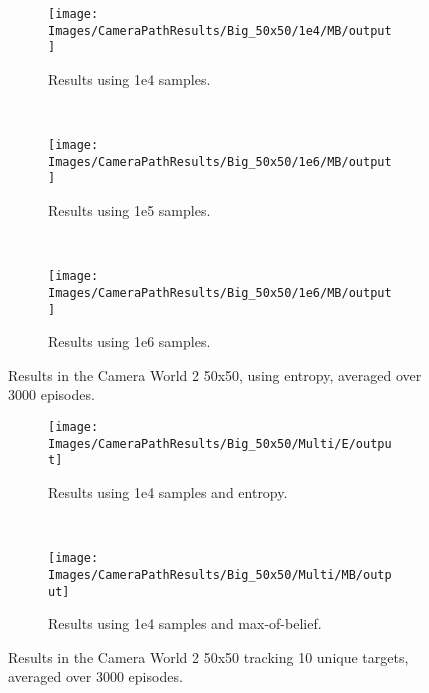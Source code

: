 \begin{figure}[ht]
        \centering
        \begin{subfigure}[t]{0.3\textwidth}
                \texttt{[image: Images/CameraPathResults/Big\_50x50/1e4/MB/output]}
                \caption{Results using 1e4 samples.}
                \label{fig:cpb4mb}
        \end{subfigure}%
        ~ %
        \begin{subfigure}[t]{0.3\textwidth}
                \texttt{[image: Images/CameraPathResults/Big\_50x50/1e6/MB/output]}
                \caption{Results using 1e5 samples.}
                \label{fig:cpb5mb}
        \end{subfigure}
        ~ %
        \begin{subfigure}[t]{0.3\textwidth}
                \texttt{[image: Images/CameraPathResults/Big\_50x50/1e6/MB/output]}
                \caption{Results using 1e6 samples.}
                \label{fig:cpb6mb}
        \end{subfigure}
        \caption{Results in the Camera World 2 50x50, using entropy, averaged over 3000 episodes.}\label{fig:cpbmb}
\end{figure}

\begin{figure}[ht]
        \centering
        \begin{subfigure}[t]{0.5\textwidth}
                \texttt{[image: Images/CameraPathResults/Big\_50x50/Multi/E/output]}
                \caption{Results using 1e4 samples and entropy.}
                \label{fig:cpb4e10}
        \end{subfigure}%
        ~ %
        \begin{subfigure}[t]{0.5\textwidth}
                \texttt{[image: Images/CameraPathResults/Big\_50x50/Multi/MB/output]}
                \caption{Results using 1e4 samples and max-of-belief.}
                \label{fig:cpb5mb10}
        \end{subfigure}
        \caption{Results in the Camera World 2 50x50 tracking 10 unique targets, averaged over 3000 episodes.}\label{fig:cpb10}
\end{figure}


